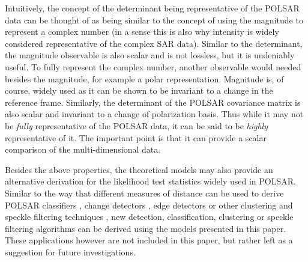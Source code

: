 \documentclass[journal]{IEEEtran}
\begin{document}
Intuitively, the concept of the determinant being representative of the POLSAR data can be thought of as being similar to the concept of using the magnitude to represent a complex number
(in a sense this is also why intensity is widely considered representative of the complex SAR data).
Similar to the determinant, the magnitude observable is also scalar and is not lossless, but it is undeniably useful.
To fully represent the complex number, another observable would needed besides the magnitude, for example a polar representation.
Magnitude is, of course, widely used as it can be shown to be invariant to a change in the reference frame.
Similarly, the determinant of the POLSAR covariance matrix is also scalar and invariant to a change of polarization basis.
Thus while it may not be \textit{fully} representative of the POLSAR data, it can be said to be \textit{highly} representative of it.
The important point is that it can provide a scalar comparison of the multi-dimensional data.

Besides the above properties, the theoretical models may also provide an alternative derivation for the likelihood test statistics widely used in POLSAR.
Similar to the way that different measures of distance can be used to derive POLSAR classifiers \cite{Lee_1999_TGRS}, change detectors \cite{Conradsen_2003_TGRS_4}, edge detectors \cite{Schou_2003_TGRS_20} or other clustering and speckle filtering techniques \cite{Le_2010_ACRS} \cite{Le_2011_ACRS}, 
new detection, classification, clustering or speckle filtering algorithms can be derived using the models presented in this paper.
These applications however are not included in this paper, but rather left as a suggestion for future investigations.
\end{document}
